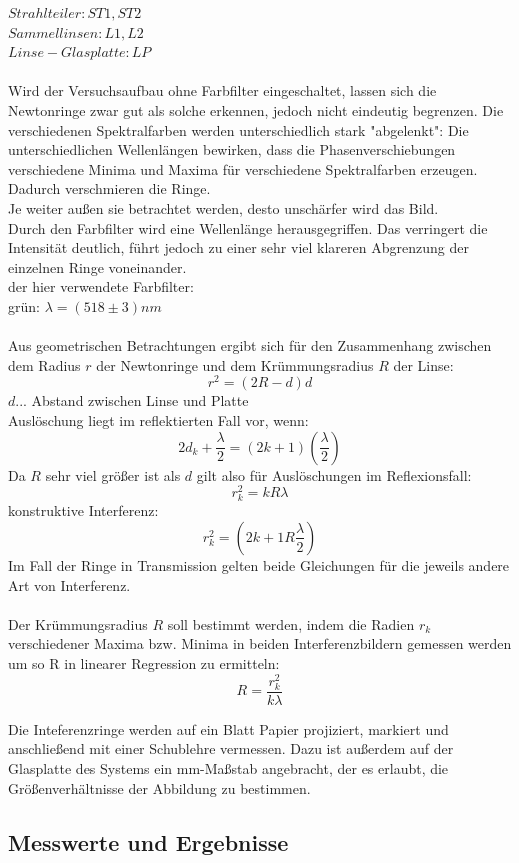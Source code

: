 \documentclass[12pt,a4paper]{article}
\begin{document}
\begin{multicols}{2}
\noindent $Strahlteiler: ST1, ST2$\\
$Sammellinsen: L1, L2$\\
$Linse-Glasplatte: LP$\\
\\
Wird der Versuchsaufbau ohne Farbfilter eingeschaltet, lassen sich die Newtonringe zwar gut als solche erkennen, jedoch nicht eindeutig begrenzen. Die verschiedenen Spektralfarben werden unterschiedlich stark "abgelenkt": Die unterschiedlichen Wellenlängen bewirken, dass die Phasenverschiebungen verschiedene Minima und Maxima für verschiedene Spektralfarben erzeugen. Dadurch verschmieren die Ringe.\\
Je weiter außen sie betrachtet werden, desto unschärfer wird das Bild.\\
Durch den Farbfilter wird eine Wellenlänge herausgegriffen. Das verringert die Intensität deutlich, führt jedoch zu einer sehr viel klareren Abgrenzung der einzelnen Ringe voneinander.\\
der hier verwendete Farbfilter:\\
grün: $\lambda = (518 \pm 3) nm$\\
\\
Aus geometrischen Betrachtungen ergibt sich für den Zusammenhang zwischen dem Radius $r$ der Newtonringe und dem Krümmungsradius $R$ der Linse:
$$r^2 = (2R-d)d$$
$d$... Abstand zwischen Linse und Platte\\
Auslöschung liegt im reflektierten Fall vor, wenn:
$$2d_k + \frac{\lambda}{2}=(2k+1)(\frac{\lambda}{2})$$
Da $R$ sehr viel größer ist als $d$ gilt also für Auslöschungen im Reflexionsfall:
$$r_k^2 =kR\lambda$$
konstruktive Interferenz:
$$r_k^2=(2k+1R \frac{\lambda}{2})$$
Im Fall der Ringe in Transmission gelten beide Gleichungen für die jeweils andere Art von Interferenz.\\
\\
Der Krümmungsradius $R$ soll bestimmt werden, indem die Radien $r_k$ verschiedener Maxima bzw. Minima in beiden Interferenzbildern gemessen werden um so R in linearer Regression zu ermitteln:
$$R=\frac{r_k^2}{k \lambda}$$

\noindent Die Inteferenzringe werden auf ein Blatt Papier projiziert, markiert und anschließend mit einer Schublehre vermessen.
Dazu ist außerdem auf der Glasplatte des Systems ein mm-Maßstab angebracht, der es erlaubt, die Größenverhältnisse der Abbildung zu bestimmen.

\subsection{Messwerte und Ergebnisse}


\end{multicols}
\end{document}
